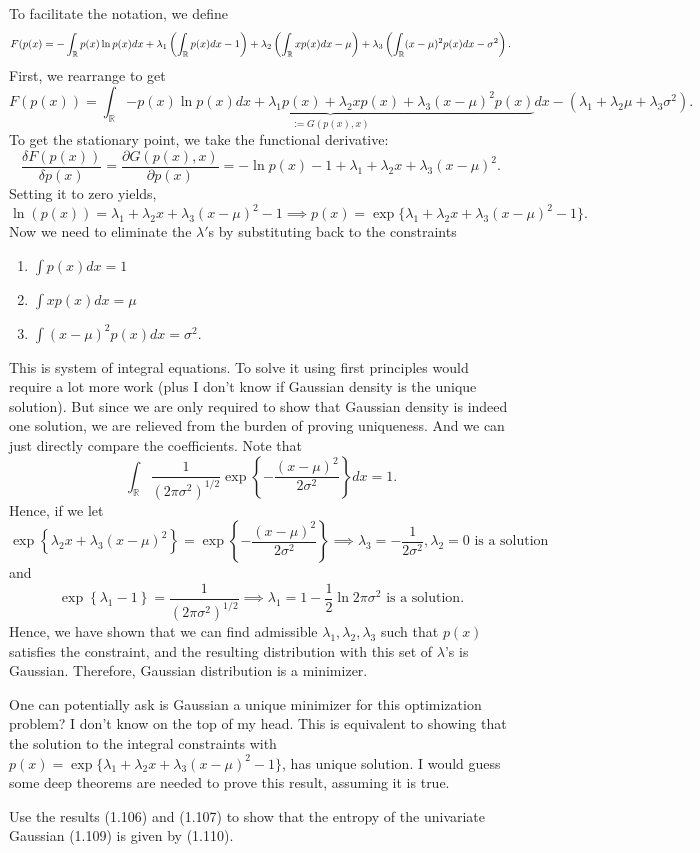 To facilitate the notation, we define 
\[
F(p(x)=-\int_{\mathbb{R}}p(x)\ln p(x)dx+\lambda_{1}\left(\int_{\mathbb{R}}p(x)dx-1\right)+\lambda_{2}\left(\int_{\mathbb{R}}xp(x)dx-\mu\right)+\lambda_{3}\left(\int_{\mathbb{R}}(x-\mu)^{2}p(x)dx-\sigma^{2}\right).
\]
First, we rearrange to get 
\[
F(p(x))=\int_{\mathbb{R}}\underbrace{-p(x)\ln p(x)dx+\lambda_{1}p(x)+\lambda_{2}xp(x)+\lambda_{3}(x-\mu)^{2}p(x)}_{:=G(p(x),x)}dx-(\lambda_{1}+\lambda_{2}\mu+\lambda_{3}\sigma^{2}).
\]
To get the stationary point, we take the functional derivative: 
\[
\frac{\delta F(p(x))}{\delta p(x)}=\frac{\partial G(p(x),x)}{\partial p(x)}=-\ln p(x)-1+\lambda_{1}+\lambda_{2}x+\lambda_{3}(x-\mu)^{2}.
\]
Setting it to zero yields, 
\[
\ln(p(x))=\lambda_{1}+\lambda_{2}x+\lambda_{3}(x-\mu)^{2}-1\implies p(x)=\exp\{\lambda_{1}+\lambda_{2}x+\lambda_{3}(x-\mu)^{2}-1\}.
\]
Now we need to eliminate the $\lambda'$s by substituting back to
the constraints 
\begin{enumerate}
\item $\int p(x)dx=1$
\item $\int xp(x)dx=\mu$
\item $\int(x-\mu)^{2}p(x)dx=\sigma^{2}.$
\end{enumerate}
This is system of integral equations. To solve it using first principles
would require a lot more work (plus I don't know if Gaussian density
is the unique solution). But since we are only required to show that
Gaussian density is indeed one solution, we are relieved from the
burden of proving uniqueness. And we can just directly compare the
coefficients. Note that 
\[
\int_{\mathbb{R}}\frac{1}{(2\pi\sigma^{2})^{1/2}}\exp\left\{ -\frac{(x-\mu)^{2}}{2\sigma^{2}}\right\} dx=1.
\]
Hence, if we let 
\[
\exp\left\{ \lambda_{2}x+\lambda_{3}(x-\mu)^{2}\right\} =\exp\left\{ -\frac{(x-\mu)^{2}}{2\sigma^{2}}\right\} \implies\lambda_{3}=-\frac{1}{2\sigma^{2}},\lambda_{2}=0\text{ is a solution}
\]
and 
\[
\exp\left\{ \lambda_{1}-1\right\} =\frac{1}{(2\pi\sigma^{2})^{1/2}}\implies\lambda_{1}=1-\frac{1}{2}\ln2\pi\sigma^{2}\text{ is a solution}.
\]
Hence, we have shown that we can find admissible $\lambda_{1},\lambda_{2},\lambda_{3}$
such that $p(x)$ satisfies the constraint, and the resulting distribution
with this set of $\lambda$'s is Gaussian. Therefore, Gaussian distribution
is a minimizer. 
\begin{rem}
One can potentially ask is Gaussian a unique minimizer for this optimization
problem? I don't know on the top of my head. This is equivalent to
showing that the solution to the integral constraints with $p(x)=\exp\{\lambda_{1}+\lambda_{2}x+\lambda_{3}(x-\mu)^{2}-1\}$,
has unique solution. I would guess some deep theorems are needed to
prove this result, assuming it is true.\\
\begin{cBoxA}{}
 Use the results (1.106) and (1.107) to show that the entropy of
the univariate Gaussian (1.109) is given by (1.110).
\end{cBoxA}
\end{rem}
